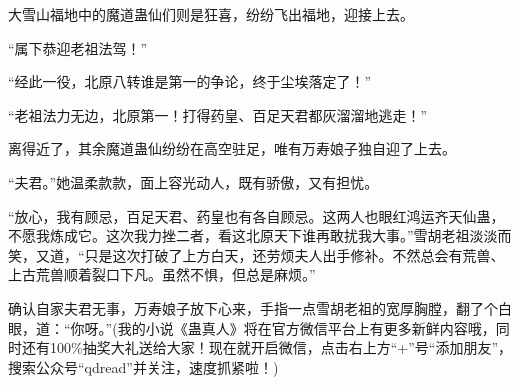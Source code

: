 \begin{this_body}
大雪山福地中的魔道蛊仙们则是狂喜，纷纷飞出福地，迎接上去。

“属下恭迎老祖法驾！”

“经此一役，北原八转谁是第一的争论，终于尘埃落定了！”

“老祖法力无边，北原第一！打得药皇、百足天君都灰溜溜地逃走！”

离得近了，其余魔道蛊仙纷纷在高空驻足，唯有万寿娘子独自迎了上去。

“夫君。”她温柔款款，面上容光动人，既有骄傲，又有担忧。

“放心，我有顾忌，百足天君、药皇也有各自顾忌。这两人也眼红鸿运齐天仙蛊，不愿我炼成它。这次我力挫二者，看这北原天下谁再敢扰我大事。”雪胡老祖淡淡而笑，又道，“只是这次打破了上方白天，还劳烦夫人出手修补。不然总会有荒兽、上古荒兽顺着裂口下凡。虽然不惧，但总是麻烦。”

确认自家夫君无事，万寿娘子放下心来，手指一点雪胡老祖的宽厚胸膛，翻了个白眼，道：“你呀。”(我的小说《蛊真人》将在官方微信平台上有更多新鲜内容哦，同时还有100\%抽奖大礼送给大家！现在就开启微信，点击右上方“+”号“添加朋友”，搜索公众号“qdread”并关注，速度抓紧啦！)

\end{this_body}

